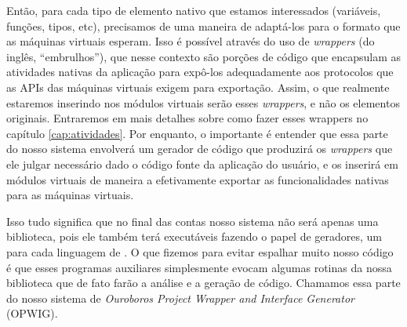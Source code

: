    Então, para cada tipo de elemento nativo que estamos interessados
    (variáveis, funções, tipos, etc), precisamos de uma maneira de adaptá-los
    para o formato que as máquinas virtuais esperam. Isso é possível através do
    uso de \textit{wrappers} (do inglês, ``embrulhos''), que nesse contexto são
    porções de código que encapsulam as atividades nativas da aplicação para
    expô-los adequadamente aos protocolos que as APIs das máquinas virtuais
    exigem para exportação. Assim, o que realmente estaremos inserindo nos
    módulos virtuais serão esses \textit{wrappers}, e não os elementos
    originais. Entraremos em mais detalhes sobre como fazer esses wrappers no
    capítulo \ref{cap:atividades}. Por enquanto, o importante é entender que
    essa parte do nosso sistema envolverá um gerador de código que produzirá
    os \textit{wrappers} que ele julgar necessário dado o código fonte da
    aplicação do usuário, e os inserirá em módulos virtuais de maneira a
    efetivamente exportar as funcionalidades nativas para as máquinas virtuais.

    Isso tudo significa que no final das contas nosso sistema não será apenas
    uma biblioteca, pois ele também terá executáveis fazendo o papel de
    geradores, um para cada linguagem de \script{}. O que fizemos para evitar
    espalhar muito nosso código é que esses programas auxiliares simplesmente
    evocam algumas rotinas da nossa biblioteca que de fato farão a análise e
    a geração de código. Chamamos essa parte do nosso sistema de \emph{Ouroboros
    Project Wrapper and Interface Generator} (OPWIG).

